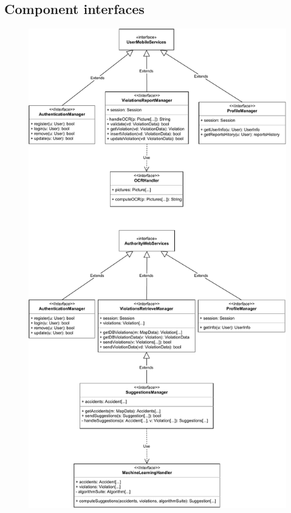 \documentclass[12pt,a4paper]{article}
\begin{document}
\subsection{Component interfaces}
\begin{figure}[H]
		\centering
		\includegraphics[width=0.8\linewidth]{../assets/images/component_interfaces1.pdf}
	\end{figure}
\end{document}
